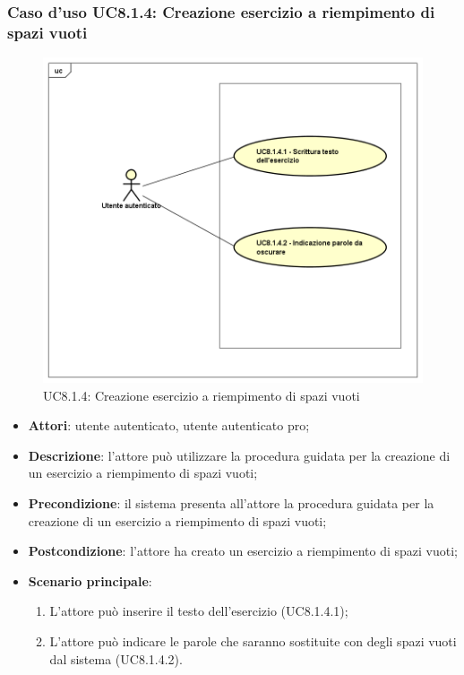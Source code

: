 \subsubsection{Caso d'uso UC8.1.4: Creazione esercizio a riempimento di spazi vuoti}
	\label{UC8.1.4}
	\begin{figure}[ht]
		\centering
			\includegraphics[scale=0.45,keepaspectratio]{UML/UC8_1_4.png}
		\caption{UC8.1.4: Creazione esercizio a riempimento di spazi vuoti}
	\end{figure}
	\FloatBarrier
	\begin{itemize}
		\item
			\textbf{Attori}: utente autenticato, utente autenticato pro;
		\item		
			\textbf{Descrizione}: l'attore può utilizzare la procedura guidata per la creazione di un esercizio a riempimento di spazi vuoti;
		\item
			\textbf{Precondizione}: il sistema presenta all'attore la procedura guidata per la creazione di un esercizio a riempimento di spazi vuoti;
		\item
			\textbf{Postcondizione}: l'attore ha creato un esercizio a riempimento di spazi vuoti;
		\item
			\textbf{Scenario principale}:
	       		\begin{enumerate}
	       			\item
	       			L'attore può inserire il testo dell'esercizio (UC8.1.4.1);
	       			\item
	       			L'attore può indicare le parole che saranno sostituite con degli spazi vuoti dal sistema (UC8.1.4.2).
	 			\end{enumerate}
	\end{itemize}
	
